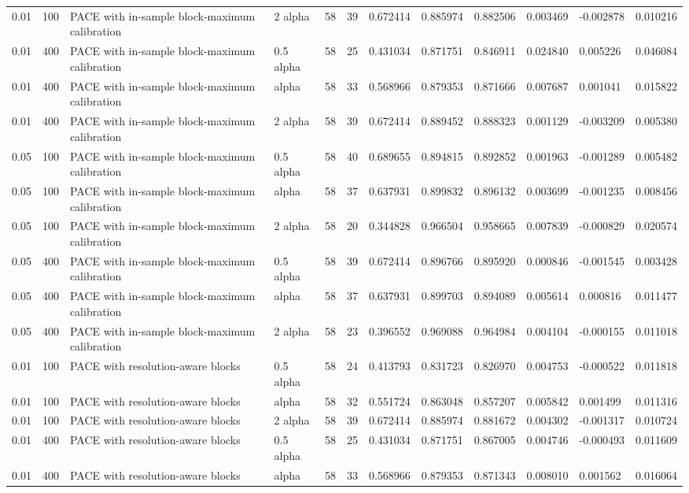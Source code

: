 \begin{tabular}{llllllllllll}
0.01 & 100 & PACE with in-sample block-maximum calibration & 2 alpha & 58 & 39 & 0.672414 & 0.885974 & 0.882506 & 0.003469 & -0.002878 & 0.010216 \\
0.01 & 400 & PACE with in-sample block-maximum calibration & 0.5 alpha & 58 & 25 & 0.431034 & 0.871751 & 0.846911 & 0.024840 & 0.005226 & 0.046084 \\
0.01 & 400 & PACE with in-sample block-maximum calibration & alpha & 58 & 33 & 0.568966 & 0.879353 & 0.871666 & 0.007687 & 0.001041 & 0.015822 \\
0.01 & 400 & PACE with in-sample block-maximum calibration & 2 alpha & 58 & 39 & 0.672414 & 0.889452 & 0.888323 & 0.001129 & -0.003209 & 0.005380 \\
0.05 & 100 & PACE with in-sample block-maximum calibration & 0.5 alpha & 58 & 40 & 0.689655 & 0.894815 & 0.892852 & 0.001963 & -0.001289 & 0.005482 \\
0.05 & 100 & PACE with in-sample block-maximum calibration & alpha & 58 & 37 & 0.637931 & 0.899832 & 0.896132 & 0.003699 & -0.001235 & 0.008456 \\
0.05 & 100 & PACE with in-sample block-maximum calibration & 2 alpha & 58 & 20 & 0.344828 & 0.966504 & 0.958665 & 0.007839 & -0.000829 & 0.020574 \\
0.05 & 400 & PACE with in-sample block-maximum calibration & 0.5 alpha & 58 & 39 & 0.672414 & 0.896766 & 0.895920 & 0.000846 & -0.001545 & 0.003428 \\
0.05 & 400 & PACE with in-sample block-maximum calibration & alpha & 58 & 37 & 0.637931 & 0.899703 & 0.894089 & 0.005614 & 0.000816 & 0.011477 \\
0.05 & 400 & PACE with in-sample block-maximum calibration & 2 alpha & 58 & 23 & 0.396552 & 0.969088 & 0.964984 & 0.004104 & -0.000155 & 0.011018 \\
0.01 & 100 & PACE with resolution-aware blocks & 0.5 alpha & 58 & 24 & 0.413793 & 0.831723 & 0.826970 & 0.004753 & -0.000522 & 0.011818 \\
0.01 & 100 & PACE with resolution-aware blocks & alpha & 58 & 32 & 0.551724 & 0.863048 & 0.857207 & 0.005842 & 0.001499 & 0.011316 \\
0.01 & 100 & PACE with resolution-aware blocks & 2 alpha & 58 & 39 & 0.672414 & 0.885974 & 0.881672 & 0.004302 & -0.001317 & 0.010724 \\
0.01 & 400 & PACE with resolution-aware blocks & 0.5 alpha & 58 & 25 & 0.431034 & 0.871751 & 0.867005 & 0.004746 & -0.000493 & 0.011609 \\
0.01 & 400 & PACE with resolution-aware blocks & alpha & 58 & 33 & 0.568966 & 0.879353 & 0.871343 & 0.008010 & 0.001562 & 0.016064 \\

\end{tabular}
